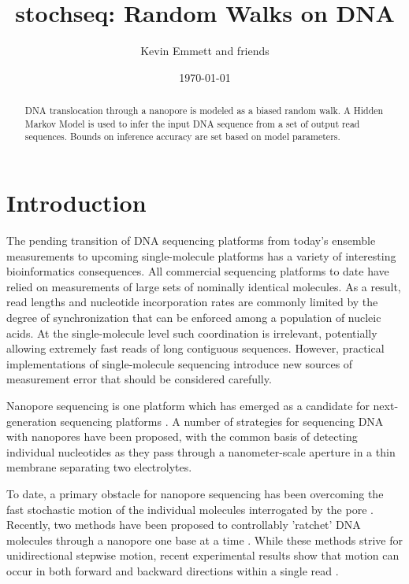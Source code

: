 \documentclass[12pt]{article}
\begin{document}
\title{stochseq: Random Walks on DNA}
\author{Kevin Emmett and friends}
\date{\today}

\maketitle

\begin{abstract}
DNA translocation through a nanopore is modeled as a biased random walk. A Hidden Markov Model is used to infer the input DNA sequence from a set of output read sequences. Bounds on inference accuracy are set based on model parameters.
\end{abstract}

\section{Introduction}
The pending transition of DNA sequencing platforms from today's ensemble measurements to upcoming single-molecule platforms has a variety of interesting bioinformatics consequences. All commercial sequencing platforms to date have relied on measurements of large sets of nominally identical molecules. As a result, read lengths and nucleotide incorporation rates are commonly limited by the degree of synchronization that can be enforced among a population of nucleic acids. At the single-molecule level such coordination is irrelevant, potentially allowing extremely fast reads of long contiguous sequences. However, practical implementations of single-molecule sequencing introduce new sources of measurement error that should be considered carefully.

Nanopore sequencing is one platform which has emerged as a candidate for next-generation sequencing platforms \cite{Branton2008}. A number of strategies for sequencing DNA with nanopores have been proposed, with the common basis of detecting individual nucleotides as they pass through a nanometer-scale aperture in a thin membrane separating two electrolytes. 

To date, a primary obstacle for nanopore sequencing has been overcoming the fast stochastic motion of the individual molecules interrogated by the pore \cite{Venkatesan2011,Lu2011}. Recently, two methods have been proposed to controllably 'ratchet' DNA molecules through a nanopore one base at a time \cite{Luan2011,Olasagasti2010}. While these methods strive for unidirectional stepwise motion, recent experimental results show that motion can occur in both forward and backward directions within a single read \cite{Cherf2012}.
\end{document}

